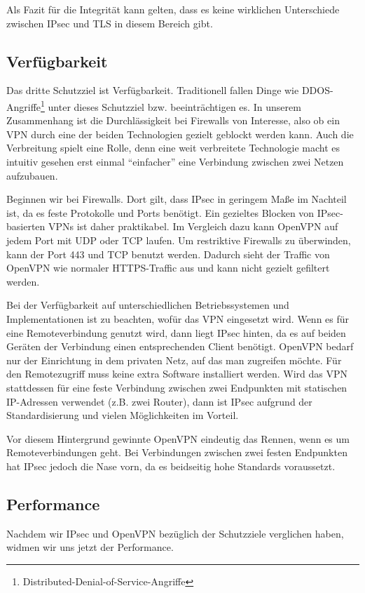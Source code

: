 \documentclass[12pt]{scrartcl}
\begin{document}
Als Fazit für die Integrität kann gelten, dass es keine wirklichen Unterschiede zwischen IPsec und TLS in diesem Bereich gibt.

\subsection{Verfügbarkeit}
Das dritte Schutzziel ist Verfügbarkeit. Traditionell fallen Dinge wie DDOS-Angriffe\footnote{Distributed-Denial-of-Service-Angriffe} unter dieses Schutzziel bzw. beeinträchtigen es. In unserem Zusammenhang ist die Durchlässigkeit bei Firewalls von Interesse, also ob ein VPN durch eine der beiden Technologien gezielt geblockt werden kann. Auch die Verbreitung spielt eine Rolle, denn eine weit verbreitete Technologie macht es intuitiv gesehen erst einmal "`einfacher"' eine Verbindung zwischen zwei Netzen aufzubauen.

Beginnen wir bei Firewalls. Dort gilt, dass IPsec in geringem Maße im Nachteil ist, da es feste Protokolle und Ports benötigt. Ein gezieltes Blocken von IPsec-basierten VPNs ist daher praktikabel. Im Vergleich dazu kann OpenVPN auf jedem Port mit UDP oder TCP laufen. Um restriktive Firewalls zu überwinden, kann der Port 443 und TCP benutzt werden. Dadurch sieht der Traffic von OpenVPN wie normaler HTTPS-Traffic aus und kann nicht gezielt gefiltert werden.\cite{Sun2011}

Bei der Verfügbarkeit auf unterschiedlichen Betriebssystemen und Implementationen ist zu beachten, wofür das VPN eingesetzt wird. Wenn es für eine Remoteverbindung genutzt wird, dann liegt IPsec hinten, da es auf beiden Geräten der Verbindung einen entsprechenden Client benötigt. OpenVPN bedarf nur der Einrichtung in dem privaten Netz, auf das man zugreifen möchte. Für den Remotezugriff muss keine extra Software installiert werden. Wird das VPN stattdessen für eine feste Verbindung zwischen zwei Endpunkten mit statischen IP-Adressen verwendet (z.B. zwei Router), dann ist IPsec aufgrund der Standardisierung und vielen Möglichkeiten im Vorteil.\cite{Sun2011} 

Vor diesem Hintergrund gewinnte OpenVPN eindeutig das Rennen, wenn es um Remoteverbindungen geht. Bei Verbindungen zwischen zwei festen Endpunkten hat IPsec jedoch die Nase vorn, da es beidseitig hohe Standards voraussetzt.

\subsection{Performance}
Nachdem wir IPsec und OpenVPN bezüglich der Schutzziele verglichen haben, widmen wir uns jetzt der Performance.
\end{document}
